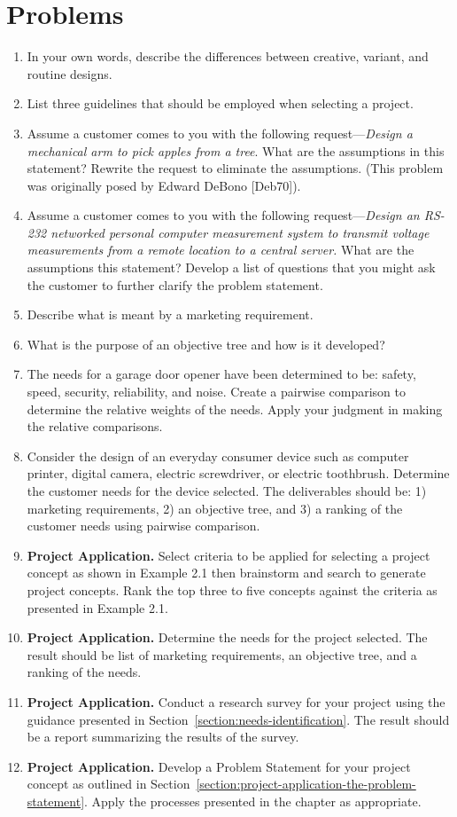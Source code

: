 \section{Problems}
\label{section:problems}


\begin{enumerate}
\def\labelenumi{\arabic{enumi}.}
\item
  In your own words, describe the differences between creative, variant,
  and routine designs.
\item
  List three guidelines that should be employed when selecting a
  project.
\item
  Assume a customer comes to you with the following
  request---\emph{Design a mechanical arm to pick apples from a tree}.
  What are the assumptions in this statement? Rewrite the request to
  eliminate the assumptions. (This problem was originally posed by
  Edward DeBono {[}Deb70{]}).
\item
  Assume a customer comes to you with the following
  request---\emph{Design an RS-232 networked personal computer
  measurement system to transmit voltage measurements from a remote
  location to a central server.} What are the assumptions this
  statement? Develop a list of questions that you might ask the customer
  to further clarify the problem statement.
\item
  Describe what is meant by a marketing requirement.
\item
  What is the purpose of an objective tree and how is it developed?
\item
  The needs for a garage door opener have been determined to be: safety,
  speed, security, reliability, and noise. Create a pairwise comparison
  to determine the relative weights of the needs. Apply your judgment in
  making the relative comparisons.
\item
  Consider the design of an everyday consumer device such as computer
  printer, digital camera, electric screwdriver, or electric toothbrush.
  Determine the customer needs for the device selected. The deliverables
  should be: 1) marketing requirements, 2) an objective tree, and 3) a
  ranking of the customer needs using pairwise comparison.
\item
  \textbf{Project Application.} Select criteria to be applied for
  selecting a project concept as shown in Example 2.1 then brainstorm
  and search to generate project concepts. Rank the top three to five
  concepts against the criteria as presented in Example 2.1.
\item
  \textbf{Project Application.} Determine the needs for the project
  selected. The result should be list of marketing requirements, an
  objective tree, and a ranking of the needs.
\item
  \textbf{Project Application.} Conduct a research survey for your
  project using the guidance presented in Section~\ref{section:needs-identification}. The result should
  be a report summarizing the results of the survey.
\item
  \textbf{Project Application.} Develop a Problem Statement for your
  project concept as outlined in Section~\ref{section:project-application-the-problem-statement}. 
  Apply the processes
  presented in the chapter as appropriate.
\end{enumerate}
